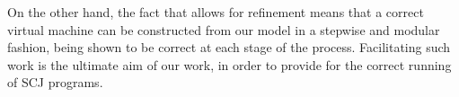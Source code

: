 On the other hand, the fact that \Circus{} allows for refinement means
that a correct virtual machine can be constructed from our model in a
stepwise and modular fashion, being shown to be correct at each stage
of the process.
Facilitating such work is the ultimate aim of our work, in order to
provide for the correct running of SCJ programs.

